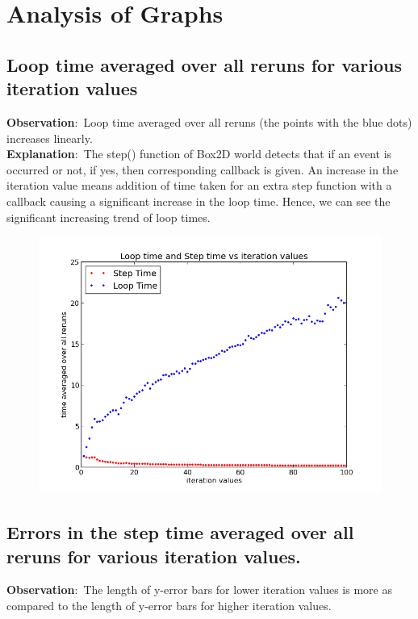 \documentclass[a4paper,11pt]{article}
\begin{document}
\section{Analysis of Graphs}
{
\subsection{Loop time averaged over all reruns for various iteration values}
{
\indent \indent \textbf{Observation}$:$ Loop time averaged over all reruns (the points with the blue dots) increases linearly.\\
\indent \textbf{Explanation}$:$ The step() function of Box2D world detects that if an event is occurred or not, if yes, then corresponding callback is given. An increase in the iteration value means addition of time taken for an extra
 step function with a callback causing a significant increase in the loop time. Hence, we can see the significant
 increasing trend of loop times.
 
 \begin{figure}[h]
    \centering
    \includegraphics[scale = 0.5]{images/plot1}
\end{figure}
}


\subsection{Errors in the step time averaged over all reruns for various iteration values.}
{
\indent \indent \textbf{Observation}$:$ The length of y-error bars for lower iteration values is more as compared to the length of
 y-error bars for higher iteration values.\\
 
}}
\end{document}
